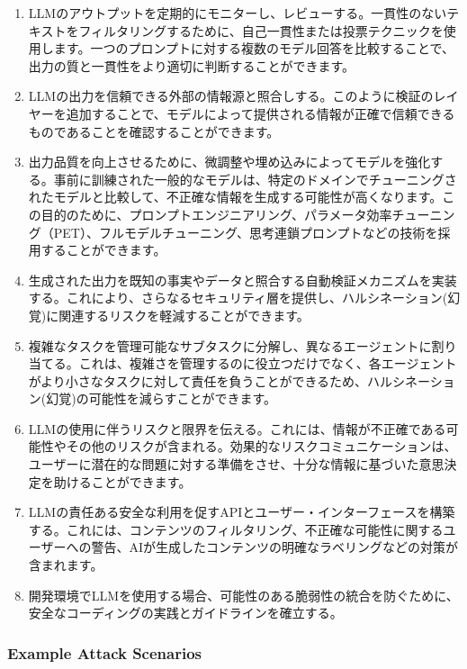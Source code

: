 \documentclass[
]{article}
\providecommand{\tightlist}{%
  \setlength{\itemsep}{0pt}\setlength{\parskip}{0pt}}
\begin{document}
\begin{enumerate}
\def\labelenumi{\arabic{enumi}.}
\tightlist
\item
  LLMのアウトプットを定期的にモニターし、レビューする。一貫性のないテキストをフィルタリングするために、自己一貫性または投票テクニックを使用します。一つのプロンプトに対する複数のモデル回答を比較することで、出力の質と一貫性をより適切に判断することができます。
\item
  LLMの出力を信頼できる外部の情報源と照合しする。このように検証のレイヤーを追加することで、モデルによって提供される情報が正確で信頼できるものであることを確認することができます。
\item
  出力品質を向上させるために、微調整や埋め込みによってモデルを強化する。事前に訓練された一般的なモデルは、特定のドメインでチューニングされたモデルと比較して、不正確な情報を生成する可能性が高くなります。この目的のために、プロンプトエンジニアリング、パラメータ効率チューニング（PET）、フルモデルチューニング、思考連鎖プロンプトなどの技術を採用することができます。
\item
  生成された出力を既知の事実やデータと照合する自動検証メカニズムを実装する。これにより、さらなるセキュリティ層を提供し、ハルシネーション(幻覚)に関連するリスクを軽減することができます。
\item
  複雑なタスクを管理可能なサブタスクに分解し、異なるエージェントに割り当てる。これは、複雑さを管理するのに役立つだけでなく、各エージェントがより小さなタスクに対して責任を負うことができるため、ハルシネーション(幻覚)の可能性を減らすことができます。
\item
  LLMの使用に伴うリスクと限界を伝える。これには、情報が不正確である可能性やその他のリスクが含まれる。効果的なリスクコミュニケーションは、ユーザーに潜在的な問題に対する準備をさせ、十分な情報に基づいた意思決定を助けることができます。
\item
  LLMの責任ある安全な利用を促すAPIとユーザー・インターフェースを構築する。これには、コンテンツのフィルタリング、不正確な可能性に関するユーザーへの警告、AIが生成したコンテンツの明確なラベリングなどの対策が含まれます。
\item
  開発環境でLLMを使用する場合、可能性のある脆弱性の統合を防ぐために、安全なコーディングの実践とガイドラインを確立する。
\end{enumerate}

\subsubsection{Example Attack Scenarios}\label{example-attack-scenarios}
\end{document}
